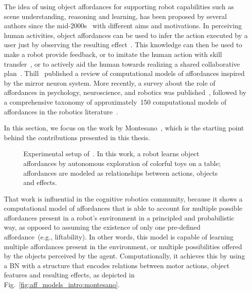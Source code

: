 The idea of using object affordances for supporting robot capabilities such as scene understanding, reasoning and learning, has been proposed by several authors since the mid-2000s~\cite{fitzpatrick:2003:icra,lopes:2005:smcb,moratz:2008} with different aims and motivations.
In perceiving human activities, object affordances can be used to infer the action executed by a user just by observing the resulting effect~\cite{kozima:2002:epirob,montesano:2008}.
This knowledge can then be used to make a robot provide feedback, or to imitate the human action with skill transfer~\cite{kozima:2002:epirob,lopes:2005:smcb,lopes:2007:iros,lopes:2007:smcb}, or to actively aid the human towards realizing a shared collaborative plan~\cite{lallee:2013:iros,jiang:2013:cvpr}.
Thill~\cite{thill:2013:jneubiorev} published a review of computational models of affordances inspired by the mirror neuron system.
More recently, a survey about the role of affordances in psychology, neuroscience, and robotics was published~\cite{jamone:2016:tcds}, followed by a comprehensive taxonomy of approximately~150 computational models of affordances in the robotics literature~\cite{zech:2017:ab}.

In this section, we focus on the work by Montesano~\cite{montesano:2008,montesano:2010:bookchap}, which is the starting point behind the contributions presented in this thesis.

\begin{figure}
\centering
{} \quad
%
\caption[Experimental setup of~\cite{montesano:2008}.]{Experimental setup of~\cite{montesano:2008}. In this work, a robot learns object affordances by autonomous exploration of colorful toys on a table; affordances are modeled as relationships between actions, objects and effects.}
\label{fig:montesano_setup}
\end{figure}

That work is influential in the cognitive robotics community, because it shows a computational model of affordances that is able to account for multiple possible affordances present in a robot's environment in a principled and probabilistic way, as opposed to assuming the existence of only one pre-defined affordance~(e.g., liftability).
In other words, this model is capable of learning multiple affordances present in the environment, or multiple possibilities offered by the objects perceived by the agent.
Computationally, it achieves this by using a \ac{BN} with a structure that encodes relations between motor actions, object features and resulting effects, as depicted in Fig.~\ref{fig:aff_models_intro:montesano}.

